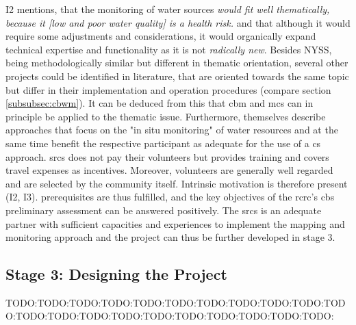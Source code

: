 I2 mentions, that the monitoring of water sources \textit{would fit well thematically, because it [low and poor water quality] is a health risk.} and that although it would require some adjustments and considerations, it would organically expand technical expertise and functionality as it is not \textit{radically new}. Besides NYSS, being methodologically similar but different in thematic orientation, several other projects could be identified in literature, that are oriented towards the same topic but differ in their implementation and operation procedures (compare section \ref*{subsubsec:cbwm}). It can be deduced from this that \acrshort{cbm} and \acrshort{mcs} can in principle be applied to the thematic issue. Furthermore, \autocite{fraislCitizenScienceEnvironmental2022} themselves describe approaches that focus on the "in situ monitoring" of water resources and at the same time benefit the respective participant as adequate for the use of a \acrlong{cs} approach. \acrshort{srcs} does not pay their volunteers but provides training and covers travel expenses as incentives. Moreover, volunteers are generally well regarded and are selected by the community itself. Intrinsic motivation is therefore present (I2, I3).\newline
\autocite{fraislCitizenScienceEnvironmental2022} prerequisites are thus fulfilled, and the key objectives of the \acrshort{rcrc}'s \acrshort{cbs} preliminary assessment can be answered positively. The \acrshort{srcs} is an adequate partner with sufficient capacities and experiences to implement the mapping and monitoring approach and the project can thus be further developed in stage 3. 

\subsection{Stage 3: Designing the Project}
TODO:TODO:TODO:TODO:TODO:TODO:TODO:TODO:TODO:TODO:TODO:TODO:TODO:TODO:TODO:TODO:TODO:TODO:TODO:TODO:TODO:


